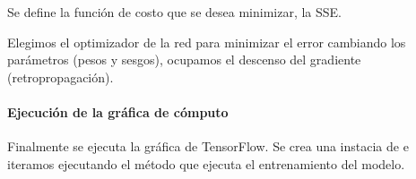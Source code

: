Se define la función de costo que se desea minimizar, la SSE.

\begin{sphinxVerbatim}[commandchars=\\\{\}]
    
\end{sphinxVerbatim}

Elegimos el optimizador de la red para minimizar el error cambiando los parámetros (pesos y sesgos), ocupamos el descenso del gradiente (retropropagación).

\begin{sphinxVerbatim}[commandchars=\\\{\}]
  
  
\end{sphinxVerbatim}

\paragraph{Ejecución de la gráfica de cómputo}

Finalmente se ejecuta la gráfica de TensorFlow. Se crea una instacia de  e iteramos ejecutando el método 
que ejecuta el entrenamiento del modelo.




